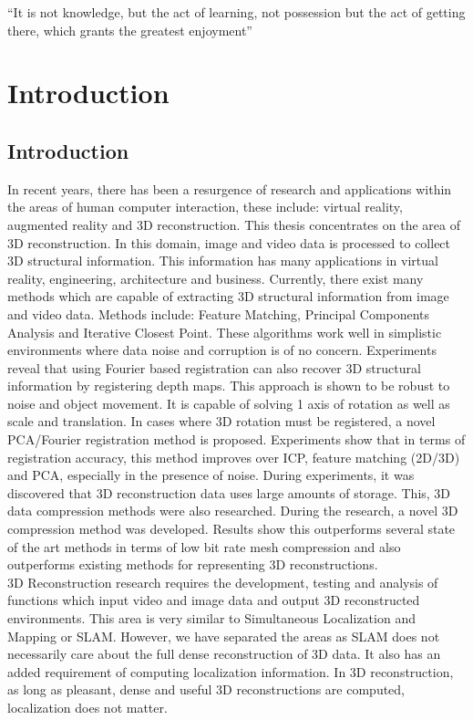 \begin{savequote}[8cm]
  ``It is not knowledge, but the act of learning, not possession but the act of getting there, which grants the greatest enjoyment''
\end{savequote}
\makeatletter
\chapter{Introduction}

\section{Introduction}

In recent years, there has been a resurgence of research and applications within the areas of human computer interaction, these include: virtual reality, augmented reality and 3D reconstruction. This thesis concentrates on the area of 3D reconstruction. In this domain, image and video data is processed to collect 3D structural information. This information has many applications in virtual reality, engineering, architecture and business. Currently, there exist many methods which are capable of extracting 3D structural information from image and video data. Methods include: Feature Matching, Principal Components Analysis and Iterative Closest Point. These algorithms work well in simplistic environments where data noise and corruption is of no concern. Experiments reveal that using Fourier based registration can also recover 3D structural information by registering depth maps. This approach is shown to be robust to noise and object movement. It is capable of solving 1 axis of rotation as well as scale and translation. In cases where 3D rotation must be registered, a novel PCA/Fourier registration method is proposed. Experiments show that in terms of registration accuracy, this method improves over ICP, feature matching (2D/3D) and PCA, especially in the presence of noise. During experiments, it was discovered that 3D reconstruction data uses large amounts of storage. This, 3D data compression methods were also researched. During the research, a novel 3D compression method was developed. Results show this outperforms several state of the art methods in terms of low bit rate mesh compression and also outperforms existing methods for representing 3D reconstructions. \\

3D Reconstruction research requires the development, testing and analysis of functions which input video and image data and output 3D reconstructed environments. This area is very similar to Simultaneous Localization and Mapping or SLAM. However, we have separated the areas as SLAM does not necessarily care about the full dense reconstruction of 3D data. It also has an added requirement of computing localization information. In 3D reconstruction, as long as pleasant, dense and useful 3D reconstructions are computed, localization does not matter.

